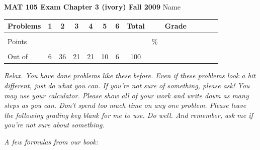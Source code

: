 \documentclass[12pt]{article}
\begin{document}
{\bf MAT 105 Exam Chapter 3 (ivory) Fall 2009} \hspace{.4in} {\large Name} \hrulefill

\hrulefill


\begin{center}

\begin{tabular}
{|l|c|c|c|c|c|c|c|c|c|c|c|c|c|} \hline

 Problems & \hspace{5 pt} 1 \hspace{5 pt}  & \hspace{5 pt} 2 \hspace{5 pt} & \hspace{5 pt} 3 \hspace{5 pt} & \hspace{5 pt} 4 \hspace{5 pt} & \hspace{5 pt} 5 \hspace{5 pt} &  \hspace{5 pt} 6 \hspace{5 pt} &  \hspace{5 pt} Total  \hspace{5 pt} & &  \hspace{5 pt} Grade \hspace{5 pt}  \\ \hline
&&&&&&& &&\\  
Points &&&&&&& &    \hspace{.8in}\% &  \\ 
&&&&&& &&& \\  \hline
Out of & 6 & 36  & 21 & 21 & 10 & 6 &100 & & \\ \hline

\end {tabular}
 
\end{center}

\emph{Relax.  You have done problems like these before.  Even if these problems look a bit different, just do what you can.  If you're not sure of something, please ask! You may use your calculator.  Please show all of your work and write down as many steps as you can.  Don't spend too much time on any one problem.  Please leave the following grading key blank for me to use.  Do well.  And remember, ask me if you're not sure about something.}
 
 \vspace{.1 in}
 
 \emph{A few formulas from our book:}
  \vspace{.2in}
 
\end{document}

